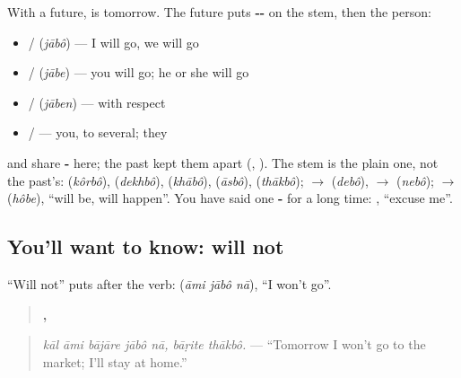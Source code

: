 With a future, \textbf{} is tomorrow. The future puts \textbf{--} on the stem, then the person:

\begin{itemize}
\raggedright
  \item \textbf{} / \textbf{} \textbf{} (\emph{jābô}) — I will go, we will go
  \item \textbf{} / \textbf{} \textbf{} (\emph{jābe}) — you will go; he or she will go
  \item \textbf{} / \textbf{} \textbf{} (\emph{jāben}) — with respect
  \item \textbf{} / \textbf{} \textbf{} — you, to several; they
\end{itemize}

\textbf{} and \textbf{} share \textbf{-} here; the past kept them apart (\textbf{}, \textbf{}). The stem is the plain one, not the past's: \textbf{} (\emph{kôrbô}), \textbf{} (\emph{dekhbô}), \textbf{} (\emph{khābô}), \textbf{} (\emph{āsbô}), \textbf{} (\emph{thākbô}); \textbf{} $\to$ \textbf{} (\emph{debô}), \textbf{} $\to$ \textbf{} (\emph{nebô}); \textbf{} $\to$ \textbf{} (\emph{hôbe}), \textquotedblleft{}will be, will happen\textquotedblright{}. You have said one \textbf{-} for a long time: \textbf{ }, \textquotedblleft{}excuse me\textquotedblright{}.

\subsection*{You'll want to know: will not}
\textquotedblleft{}Will not\textquotedblright{} puts \textbf{} after the verb: \textbf{  } (\emph{āmi jābô nā}), \textquotedblleft{}I won't go\textquotedblright{}.

\begin{quote}
\textbf{    ,  }
\end{quote}

\begin{quote}
\emph{kāl āmi bājāre jābô nā, bāṛite thākbô.} — \textquotedblleft{}Tomorrow I won't go to the market; I'll stay at home.\textquotedblright{}
\end{quote}

